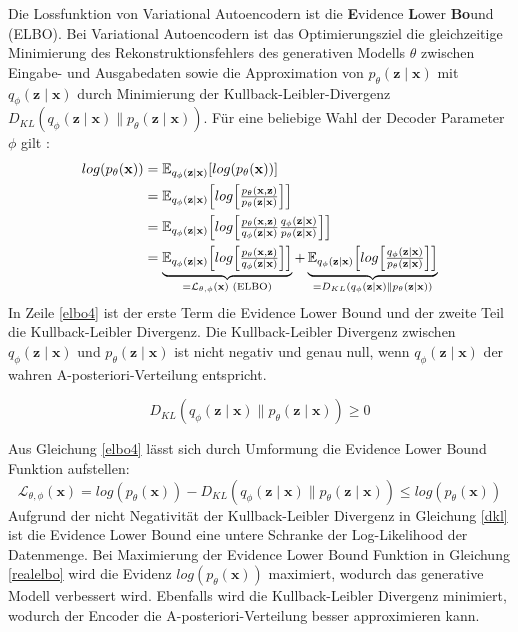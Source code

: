 \label{elbo}
Die Lossfunktion von Variational Autoencodern ist die \textbf{E}vidence \textbf{L}ower \textbf{Bo}und (ELBO).
Bei Variational Autoencodern ist das Optimierungsziel die gleichzeitige Minimierung des Rekonstruktionsfehlers des generativen Modells $\theta$ zwischen Eingabe- und Ausgabedaten sowie die Approximation von $p_\theta (\mathbf{z\mid x})$ mit $q_\phi (\mathbf{z\mid x})$ durch Minimierung der Kullback-Leibler-Divergenz$D_{KL}(q_\phi(\mathbf{z\mid x})\parallel p_\theta(\mathbf{z\mid x}))$.
Für eine beliebige Wahl der Decoder Parameter $\phi$ gilt \citep{introVAE}:
\begin{align}
    log(p_\theta(\mathbf{x})) &= \mathbb{E}_{ q_\phi(\mathbf{z\mid x}) } [log( p_\theta(\mathbf{x}) )] \nonumber \\
    &= \mathbb{E}_{q_\phi( \mathbf{z\mid x} )} \Bigl[ log \Bigl[ \tfrac{ p_\theta(\mathbf{x,z}) }{ p_\theta(\mathbf{z \mid x}) } \Bigr] \Bigr] \nonumber \\
    &= \mathbb{E}_{q_\phi( \mathbf{z\mid x} )} \Bigl[ log \Bigl[ \tfrac{ p_\theta(\mathbf{x,z}) }{ q_\phi( \mathbf{z\mid x} ) } \tfrac{ q_\phi( \mathbf{z\mid x} ) }{ p_\theta(\mathbf{z \mid x}) }\Bigr] \Bigr] \nonumber \\
    &= \underbrace{\mathbb{E}_{q_\phi( \mathbf{z\mid x} )} \Bigl[ log \Bigl[ \tfrac{ p_\theta(\mathbf{x,z}) }{ q_\phi( \mathbf{z\mid x} ) } \Bigr] \Bigr]}_{=\mathcal{L}_{\theta,\phi}(\mathbf{x}) \text{ (ELBO)}} + \underbrace{\mathbb{E}_{q_\phi( \mathbf{z\mid x} )} \Bigl[ log \Bigl[ \tfrac{ q_\phi( \mathbf{z\mid x} ) }{ p_\theta(\mathbf{z \mid x}) }\Bigr] \Bigr]}_{=D_{KL}(q_\phi(\mathbf{z\mid x})\parallel p_\theta(\mathbf{z\mid x}))} \label{elbo4}
\end{align}
In Zeile \ref{elbo4} ist der erste Term die Evidence Lower Bound und der zweite Teil die Kullback-Leibler Divergenz.
Die Kullback-Leibler Divergenz zwischen $q_\phi(\mathbf{z\mid x})$ und $p_\theta(\mathbf{z\mid x})$ ist nicht negativ und genau null, wenn $q_\phi(\mathbf{z\mid x})$ der wahren A-posteriori-Verteilung entspricht.

\begin{equation}
    \label{dkl}
    D_{KL}(q_\phi(\mathbf{z\mid x})\parallel p_\theta(\mathbf{z\mid x})) \geq 0
\end{equation}

Aus Gleichung \ref{elbo4} lässt sich durch Umformung die Evidence Lower Bound Funktion aufstellen:
\begin{equation}
    \label{realelbo}
    \mathcal{L}_{\theta,\phi}(\mathbf{x}) = log(p_\theta(\mathbf{x})) - D_{KL}(q_\phi(\mathbf{z\mid x})\parallel p_\theta(\mathbf{z\mid x})) \leq log(p_\theta(\mathbf{x})) 
\end{equation}
Aufgrund der nicht Negativität der Kullback-Leibler Divergenz in Gleichung \ref{dkl} ist die Evidence Lower Bound eine untere Schranke der Log-Likelihood der Datenmenge.
Bei Maximierung der Evidence Lower Bound Funktion in Gleichung \ref{realelbo} wird die Evidenz $log(p_\theta(\mathbf{x}))$ maximiert, wodurch das generative Modell verbessert wird. Ebenfalls wird die Kullback-Leibler Divergenz minimiert, wodurch der Encoder die A-posteriori-Verteilung besser approximieren kann.

